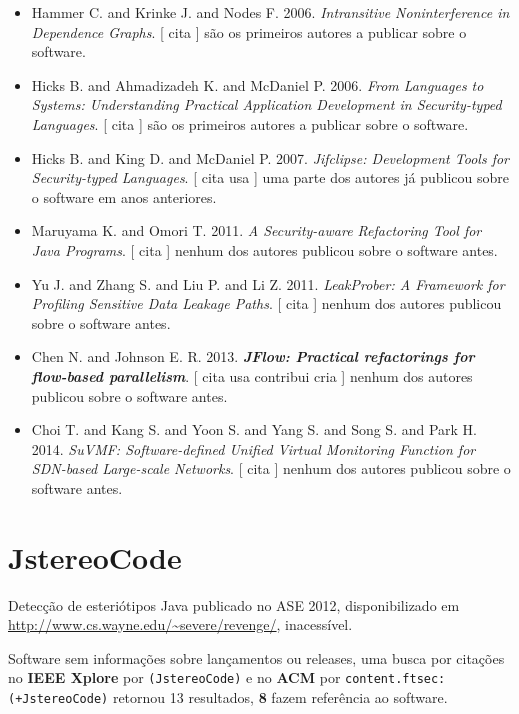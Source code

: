 \begin{itemize}
\item Hammer C. and Krinke J. and Nodes F.
      2006.
        \textit{ Intransitive Noninterference in Dependence Graphs}.
      [
          cita
      ]
são os primeiros autores a publicar sobre o software.
\item Hicks B. and Ahmadizadeh K. and McDaniel P.
      2006.
        \textit{ From Languages to Systems: Understanding Practical Application Development in Security-typed Languages}.
      [
          cita
      ]
são os primeiros autores a publicar sobre o software.
\item Hicks B. and King D. and McDaniel P.
      2007.
        \textit{ Jifclipse: Development Tools for Security-typed Languages}.
      [
          cita
          usa
      ]
uma parte dos autores já publicou sobre o software em anos anteriores.
\item Maruyama K. and Omori T.
      2011.
        \textit{ A Security-aware Refactoring Tool for Java Programs}.
      [
          cita
      ]
nenhum dos autores publicou sobre o software antes.
\item Yu J. and Zhang S. and Liu P. and Li Z.
      2011.
        \textit{ LeakProber: A Framework for Profiling Sensitive Data Leakage Paths}.
      [
          cita
      ]
nenhum dos autores publicou sobre o software antes.
\item Chen N. and Johnson E. R.
      2013.
        \textbf{\textit{ JFlow: Practical refactorings for flow-based parallelism}}.
      [
          cita
          usa
          contribui
          cria
      ]
nenhum dos autores publicou sobre o software antes.
\item Choi T. and Kang S. and Yoon S. and Yang S. and Song S. and Park H.
      2014.
        \textit{ SuVMF: Software-defined Unified Virtual Monitoring Function for SDN-based Large-scale Networks}.
      [
          cita
      ]
nenhum dos autores publicou sobre o software antes.
\end{itemize}
\section{JstereoCode}

Detecção de esteriótipos Java
publicado no ASE 2012,
disponibilizado em \url{http://www.cs.wayne.edu/~severe/revenge/},
inacessível.

Software sem informações sobre lançamentos ou releases,
uma busca por citações no {\bf IEEE Xplore} por
\texttt{(JstereoCode)}
e no {\bf ACM} por
\texttt{content.ftsec:(+JstereoCode)}
retornou
13 resultados,
{\bf 8} fazem referência ao software.


